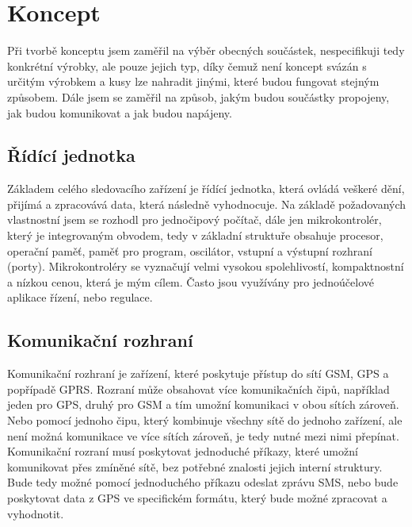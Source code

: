 \documentclass[FM,BP]{tulthesis}  %
\begin{document}

\chapter{Koncept}
Při tvorbě konceptu jsem zaměřil na výběr obecných součástek, nespecifikuji tedy konkrétní výrobky, ale pouze jejich typ, díky čemuž není koncept svázán s určitým výrobkem a kusy lze nahradit jinými, které budou fungovat stejným způsobem. Dále jsem se zaměřil na způsob, jakým budou součástky propojeny, jak budou komunikovat a jak budou napájeny.

\section{Řídící jednotka}
Základem celého sledovacího zařízení je řídící jednotka, která ovládá veškeré dění, přijímá a zpracovává data, která následně vyhodnocuje. Na základě požadovaných vlastnostní jsem se rozhodl pro jednočipový počítač, dále jen mikrokontrolér, který je integrovaným obvodem, tedy v základní struktuře obsahuje procesor, operační paměť, paměť pro program, oscilátor, vstupní a výstupní rozhraní (porty). Mikrokontroléry se vyznačují velmi vysokou spolehlivostí, kompaktnostní a nízkou cenou, která je mým cílem. Často jsou využívány pro jednoúčelové aplikace řízení, nebo regulace.

\section{Komunikační rozhraní}
Komunikační rozhraní je zařízení, které poskytuje přístup do sítí GSM, GPS a popřípadě GPRS. Rozraní může obsahovat více komunikačních čipů, například jeden pro GPS, druhý pro GSM a tím umožní komunikaci v obou sítích zároveň. Nebo pomocí jednoho čipu, který kombinuje všechny sítě do jednoho zařízení, ale není možná komunikace ve více sítích zároveň, je tedy nutné mezi nimi přepínat. Komunikační rozraní musí poskytovat jednoduché příkazy, které umožní komunikovat přes zmíněné sítě, bez potřebné znalosti jejich interní struktury. Bude tedy možné pomocí jednoduchého příkazu odeslat zprávu SMS, nebo bude poskytovat data z GPS ve specifickém formátu, který bude možné zpracovat a vyhodnotit.
\end{document}
